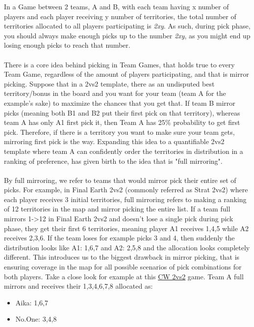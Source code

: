 In a Game between 2 teams, A and B, with each team having x number of players and each player receiving y number of territories, the total number of territories allocated to all players participating is \textit{2xy}. As such, during pick phase, you should always make enough picks up to the number \textit{2xy}, as you might end up losing enough picks to reach that number.
\\
\\
There is a core idea behind picking in Team Games, that holds true to every Team Game, regardless of the amount of players participating, and that is mirror picking. Suppose that in a 2vs2 template, there as an undisputed best territory/bonus in the board and you want for your team (team A for the example's sake) to maximize the chances that you get that. If team B mirror picks (meaning both B1 and B2 put their first pick on that territory), whereas team A has only A1 first pick it, then Team A has 25\% probability to get first pick. Therefore, if there is a territory you want to make sure your team gets, mirroring first pick is the way. Expanding this idea to a quantifiable 2vs2 template where team A can confidently order the territories in distribution in a ranking of preference, has given birth to the idea that is "full mirroring".
\\
\\
By full mirroring, we refer to teams that would mirror pick their entire set of picks. For example, in Final Earth 2vs2 (commonly referred as Strat 2vs2) where each player receives 3 initial territories, full mirroring refers to making a ranking of 12 territories in the map and mirror picking the entire list. If a team full mirrors 1->12 in Final Earth 2vs2 and doesn't lose a single pick during pick phase, they get their first 6 territories, meaning player A1 receives 1,4,5 while A2 receives 2,3,6. If the team loses for example picks 3 and 4, then suddenly the distribution looks like A1: 1,6,7 and A2: 2,5,8 and the allocation looks completely different. This introduces us to the biggest drawback in mirror picking, that is ensuring coverage in the map for all possible scenarios of pick combinations for both players. Take a close look for example at this \href{https://www.warzone.com/MultiPlayer?GameID=39930222}{CW 2vs2} game. Team A full mirrors and receives their 1,3,4,6,7,8 allocated as:
\begin{itemize}
    \item Aika: 1,6,7
    \item No.One: 3,4,8
\end{itemize}
